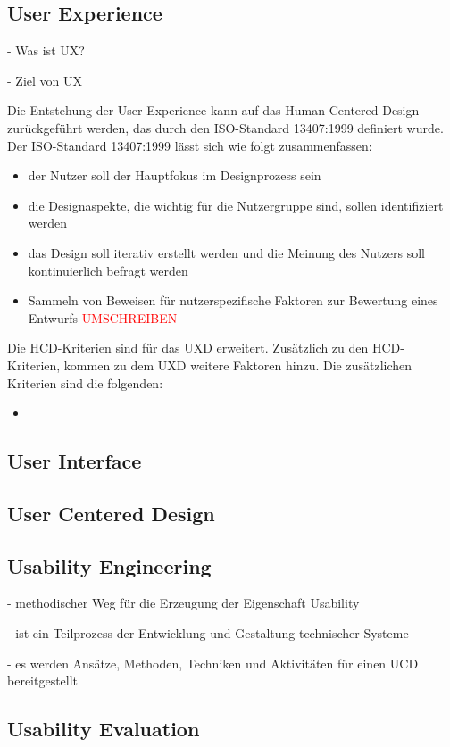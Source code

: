 \subsection{User Experience}

- Was ist UX?

- Ziel von UX

Die Entstehung der User Experience kann auf das Human Centered Design zurückgeführt werden, das durch den ISO-Standard 13407:1999 definiert wurde.
Der ISO-Standard 13407:1999 lässt sich wie folgt zusammenfassen:

\begin{itemize}
	\item der Nutzer soll der Hauptfokus im Designprozess sein
	\item die Designaspekte, die wichtig für die Nutzergruppe sind, sollen identifiziert werden
	\item das Design soll iterativ erstellt werden und die Meinung des Nutzers soll kontinuierlich befragt werden
	\item Sammeln von Beweisen für nutzerspezifische Faktoren zur Bewertung eines Entwurfs \textcolor{red}{UMSCHREIBEN}
\end{itemize}

Die HCD-Kriterien sind für das UXD erweitert.
Zusätzlich zu den HCD-Kriterien, kommen zu dem UXD weitere Faktoren hinzu.
Die zusätzlichen Kriterien sind die folgenden:

\begin{itemize}
	\item
\end{itemize}

\subsection{User Interface}

\subsection{User Centered Design}

\subsection{Usability Engineering}

- methodischer Weg für die Erzeugung der Eigenschaft Usability

- ist ein Teilprozess der Entwicklung und Gestaltung technischer Systeme

- es werden Ansätze, Methoden, Techniken und Aktivitäten für einen UCD bereitgestellt

\subsection{Usability Evaluation}
